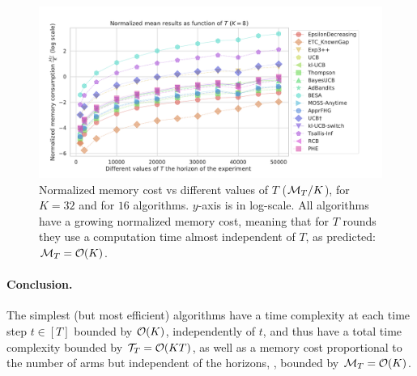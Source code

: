 \begin{figure}[h!]  %
	\includegraphics[width=1.10\linewidth]{16_different_algorithms__lognormmemory_vs_times__16pb__K8.pdf}
	\caption[Normalized memory cost vs different values of $T$.]{
        Normalized memory cost vs different values of $T$ ($\mathcal{M}_T / K$),
        for $K=32$ and for $16$ algorithms.
        $y$-axis is in log-scale.
        All algorithms have a growing normalized memory cost, meaning that for $T$ rounds they use a computation time almost independent of $T$, as predicted: $\mathcal{M}_T = \mathop{}\mathopen{}\mathcal{O}\mathopen{}\left(K\right)$.
	}
	\label{fig:3:16_different_algorithms__lognormmemory_vs_times__16pb__K8}
\end{figure}


\paragraph{Conclusion.}
%
The simplest (but most efficient) algorithms have
a time complexity at each time step $t\in[T]$ bounded by $\mathop{}\mathopen{}\mathcal{O}\mathopen{}\left(K\right)$, independently of $t$, and thus have a total time complexity bounded by $\mathcal{T}_T = \mathop{}\mathopen{}\mathcal{O}\mathopen{}\left(KT\right)$,
as well as a memory cost proportional to the number of arms but independent of the horizons, \ie, bounded by $\mathcal{M}_T = \mathop{}\mathopen{}\mathcal{O}\mathopen{}\left(K\right)$.

